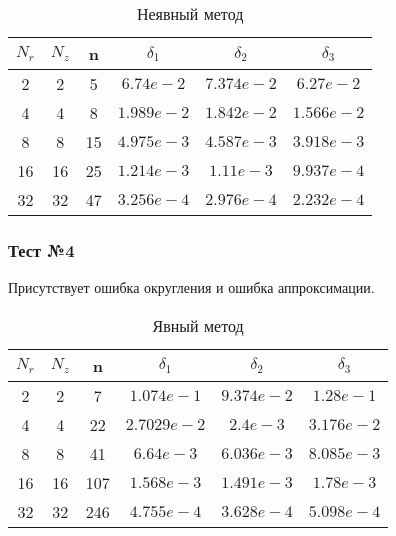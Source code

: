 \begin{table}[H]
  \begin{center}
    \begin{tabular}{*{6}c}
      \toprule
      $ N_r $ & $ N_z $ & n & $ \delta_1 $ & $ \delta_2 $ & $ \delta_3 $ \\
      \midrule
      2 & 2 & 5 & $6.74e-2 $ & $7.374e-2 $ & $6.27e-2 $  \\
      4 & 4 & 8 & $1.989e-2 $ & $1.842e-2 $ & $1.566e-2 $ \\
      8 & 8 & 15 & $4.975e-3 $ & $4.587e-3 $ & $3.918e-3 $ \\
      16 & 16 & 25 & $1.214e-3 $ & $1.11e-3 $ & $9.937e-4 $ \\
      32 & 32 & 47 & $3.256e-4 $ & $2.976e-4 $ & $2.232e-4 $ \\
      \bottomrule
    \end{tabular}
    \caption*{Неявный метод}
  \end{center}
\end{table}

\subsubsection*{Тест №4}

Присутствует ошибка округления и ошибка аппроксимации.

\begin{table}[H]
  \begin{center}
    \begin{tabular}{*{6}c}
      \toprule
      $ N_r $ & $ N_z $ & n & $ \delta_1 $ & $ \delta_2 $ & $ \delta_3 $ \\
      \midrule
      2 & 2 & 7 & $1.074e-1 $ & $9.374e-2 $ & $1.28e-1 $ \\
      4 & 4 & 22 & $2.7029e-2 $ & $2.4e-3 $ & $3.176e-2 $ \\
      8 & 8 & 41 & $6.64e-3 $ & $6.036e-3 $ & $8.085e-3 $ \\
      16 & 16 & 107 & $1.568e-3 $ & $1.491e-3 $ & $1.78e-3 $ \\
      32 & 32 & 246 & $4.755e-4 $ & $3.628e-4 $ & $5.098e-4 $ \\
      \bottomrule
    \end{tabular}
    \caption{Явный метод}
  \end{center}
\end{table}
  
